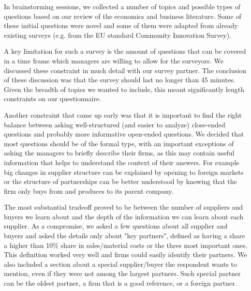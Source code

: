 \documentclass[final, dvipsnames, authoryear,12pt]{elsarticle}
\begin{document}
In brainstorming sessions, we collected a number of topics and possible types of questions based on our review of the economics and business literature. Some of these initial questions were novel and some of them were adapted from already existing surveys (e.g. from the EU standard Community Innovation Survey). 

A key limitation for such a survey is the amount of questions that can be covered in a time frame which managers are willing to allow for the surveyors. We discussed these constraint in much detail with our survey partner. The conclusion of these discussion was that the survey should last no longer than 45 minutes. Given the breadth of topics we wanted to include, this meant significantly length constraints on our questionnaire. 

Another constraint that came up early was that it is important to find the right balance between asking well-structured (and easier to analyze) close-ended questions and probably more informative open-ended questions. We decided that most questions should be of the formal type,  with an important exceptions of asking the managers to briefly describe their firms, as this may contain useful information that helps to understand the context of their answers. For example big changes in supplier structure can be explained by opening to foreign markets or the structure of partnerships can be better understood by knowing that the firm only buys from and produces to its parent company.



The most substantial tradeoff proved to be between the number of suppliers and buyers we learn about and the depth of the information we can learn about each supplier. As a compromise, we asked a few questions about all supplier and buyers and asked the details only about "key partners", defined as having a share a higher than 10\% share in sales/material costs or the three most important ones. This definition worked very well and firms could easily identify their partners. We also included a section about a special supplier/buyer the respondent wants to mention, even if they were not among the largest partners. Such special partner can be the oldest partner, a firm that is a good reference, or a foreign partner.
\end{document}
